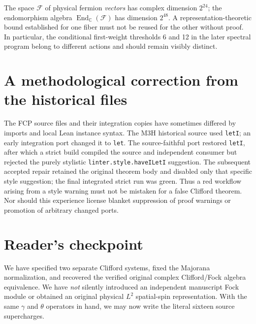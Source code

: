 \begin{remark}
The space $\mathcal F$ of physical fermion \emph{vectors} has complex
dimension $2^{24}$; the endomorphism algebra
$\operatorname{End}_{\mathbb C}(\mathcal F)$ has dimension $2^{48}$.
A representation-theoretic bound established for one fiber must not be
reused for the other without proof. In particular, the conditional
first-weight thresholds 6 and 12 in the later spectral program belong to
different actions and should remain visibly distinct.
\end{remark}

\section{A methodological correction from the historical files}
The FCP source files and their integration copies have sometimes differed
by imports and local Lean instance syntax. The M3H historical source used
\texttt{letI}; an early integration port changed it to \texttt{let}. The
source-faithful port restored \texttt{letI}, after which a strict build
compiled the source and independent consumer but rejected the purely
stylistic \texttt{linter.style.haveILetI} suggestion. The subsequent
accepted repair retained the original theorem body and disabled only that
specific style suggestion; the final integrated strict run was green.
Thus a red workflow arising from a style warning must not be mistaken for
a false Clifford theorem. Nor should this experience license blanket
suppression of proof warnings or promotion of arbitrary changed ports.


\section{Reader's checkpoint}
We have specified two separate Clifford systems, fixed the Majorana
normalization, and recovered the verified original complex Clifford/Fock
algebra equivalence. We have \emph{not} silently introduced an independent
manuscript Fock module or obtained an original physical $L^2$ spatial-spin
representation. With the same $\gamma$ and $\theta$ operators in hand, we
may now write the literal sixteen source supercharges.
